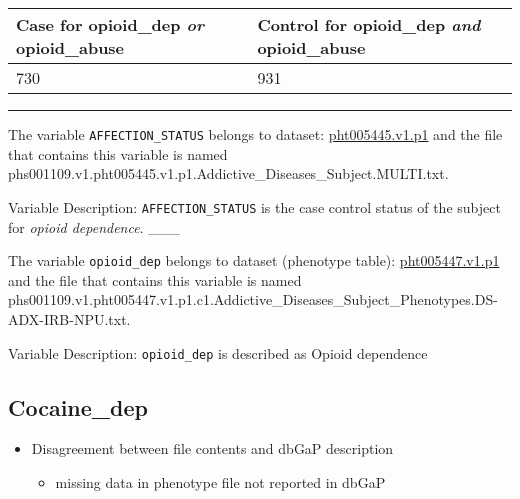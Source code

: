 \documentclass[11pt]{article}
\providecommand{\tightlist}{%
      \setlength{\itemsep}{0pt}\setlength{\parskip}{0pt}}
\begin{document}
\begin{longtable}[]{@{}ll@{}}
\toprule
\begin{minipage}[b]{0.45\columnwidth}\raggedright\strut
Case for opioid\_dep \emph{or} opioid\_abuse\strut
\end{minipage} & \begin{minipage}[b]{0.49\columnwidth}\raggedright\strut
Control for opioid\_dep \emph{and} opioid\_abuse\strut
\end{minipage}\tabularnewline
\midrule
\endhead
\begin{minipage}[t]{0.45\columnwidth}\raggedright\strut
730\strut
\end{minipage} & \begin{minipage}[t]{0.49\columnwidth}\raggedright\strut
931\strut
\end{minipage}\tabularnewline
\bottomrule
\end{longtable}

\begin{center}\rule{0.5\linewidth}{\linethickness}\end{center}

The variable \texttt{AFFECTION\_STATUS} belongs to dataset:
\href{https://www.ncbi.nlm.nih.gov/projects/gap/cgi-bin/dataset.cgi?study_id=phs001109.v1.p1\&phv=261892\&phd=6837\&pha=\&pht=5445\&phvf=1\&phdf=\&phaf=\&phtf=\&dssp=1\&consent=\&temp=1}{pht005445.v1.p1}
and the file that contains this variable is named
phs001109.v1.pht005445.v1.p1.Addictive\_Diseases\_Subject.MULTI.txt.

Variable Description: \texttt{AFFECTION\_STATUS} is the case control
status of the subject for \emph{opioid dependence}. \_\_\_

The variable \texttt{opioid\_dep} belongs to dataset (phenotype table):
\href{https://www.ncbi.nlm.nih.gov/projects/gap/cgi-bin/dataset.cgi?study_id=phs001109.v1.p1\&phv=261905\&phd=6837\&pha=\&pht=5447\&phvf=1\&phdf=\&phaf=\&phtf=1\&dssp=1\&consent=\&temp=1}{pht005447.v1.p1}
and the file that contains this variable is named
phs001109.v1.pht005447.v1.p1.c1.Addictive\_Diseases\_Subject\_Phenotypes.DS-ADX-IRB-NPU.txt.

Variable Description: \texttt{opioid\_dep} is described as Opioid
dependence

    \subsection{Cocaine\_dep}\label{cocaine_dep}

\begin{itemize}
\tightlist
\item
  Disagreement between file contents and dbGaP description

  \begin{itemize}
  \tightlist
  \item
    missing data in phenotype file not reported in dbGaP
  \end{itemize}
\end{itemize}
\end{document}

